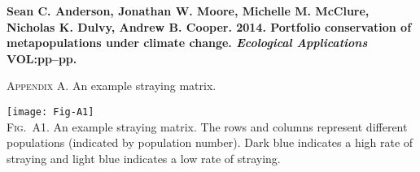 \documentclass[12pt]{article}
\begin{document}
\textbf{Sean C. Anderson, Jonathan W. Moore, Michelle M. McClure, Nicholas K. Dulvy, Andrew B. Cooper. 2014. Portfolio conservation of metapopulations under climate change. \textit{Ecological Applications} VOL:pp--pp.}

\bigskip

\textsc{Appendix A.} An example straying matrix.

\bigskip

\texttt{[image: Fig-A1]}\\
\textsc{Fig.~A1.} An example straying matrix. The rows and columns represent different populations (indicated by population number). Dark blue indicates a high rate of straying and light blue indicates a low rate of straying.
\end{document}
